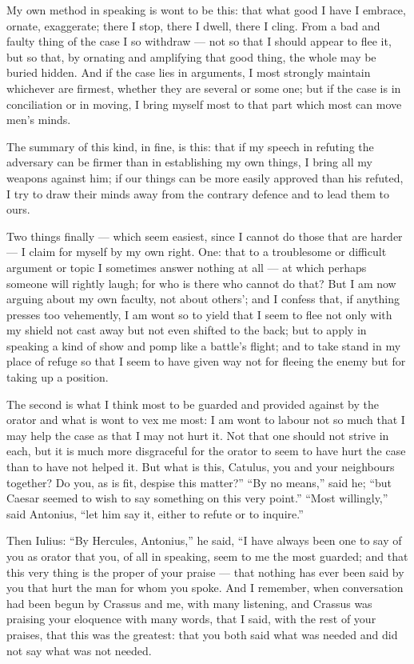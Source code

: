  My own method in speaking is wont to be this: that what good I have I embrace, ornate, exaggerate; there I stop, there I dwell, there I cling. From a bad and faulty thing of the case I so withdraw — not so that I should appear to flee it, but so that, by ornating and amplifying that good thing, the whole may be buried hidden. And if the case lies in arguments, I most strongly maintain whichever are firmest, whether they are several or some one; but if the case is in conciliation or in moving, I bring myself most to that part which most can move men's minds.

 The summary of this kind, in fine, is this: that if my speech in refuting the adversary can be firmer than in establishing my own things, I bring all my weapons against him; if our things can be more easily approved than his refuted, I try to draw their minds away from the contrary defence and to lead them to ours.

 Two things finally — which seem easiest, since I cannot do those that are harder — I claim for myself by my own right. One: that to a troublesome or difficult argument or topic I sometimes answer nothing at all — at which perhaps someone will rightly laugh; for who is there who cannot do that? But I am now arguing about my own faculty, not about others'; and I confess that, if anything presses too vehemently, I am wont so to yield that I seem to flee not only with my shield not cast away but not even shifted to the back; but to apply in speaking a kind of show and pomp like a battle's flight; and to take stand in my place of refuge so that I seem to have given way not for fleeing the enemy but for taking up a position.

 The second is what I think most to be guarded and provided against by the orator and what is wont to vex me most: I am wont to labour not so much that I may help the case as that I may not hurt it. Not that one should not strive in each, but it is much more disgraceful for the orator to seem to have hurt the case than to have not helped it. But what is this, Catulus, you and your neighbours together? Do you, as is fit, despise this matter?'' ``By no means,'' said he; ``but Caesar seemed to wish to say something on this very point.'' ``Most willingly,'' said Antonius, ``let him say it, either to refute or to inquire.''

 Then Iulius: ``By Hercules, Antonius,'' he said, ``I have always been one to say of you as orator that you, of all in speaking, seem to me the most guarded; and that this very thing is the proper of your praise — that nothing has ever been said by you that hurt the man for whom you spoke. And I remember, when conversation had been begun by Crassus and me, with many listening, and Crassus was praising your eloquence with many words, that I said, with the rest of your praises, that this was the greatest: that you both said what was needed and did not say what was not needed.

